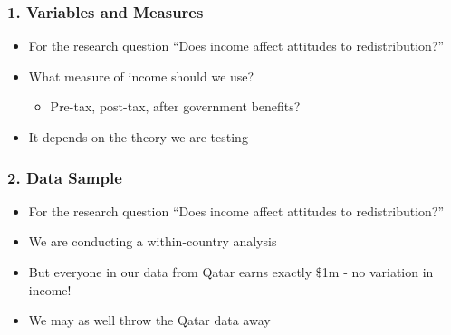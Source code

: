 \documentclass[xcolor=x11names,compress]{beamer}\usepackage[]{graphicx}\usepackage[]{color}
\renewcommand{\(}{\begin{columns}}
\renewcommand{\)}{\end{columns}}
\newcommand{\<}[1]{\begin{column}{#1}}
\renewcommand{\>}{\end{column}}
\begin{document}
\begin{frame}
\frametitle{1. Variables and Measures}
\begin{itemize}
\item For the research question ``Does income affect attitudes to redistribution?''
\pause
\item What measure of income should we use?
\pause
\begin{itemize}
\item Pre-tax, post-tax, after government benefits?
\end{itemize}
\item It depends on the theory we are testing
\end{itemize}
\end{frame}

\begin{frame}
\frametitle{2. Data Sample}
\begin{itemize}
\item For the research question ``Does income affect attitudes to redistribution?''
\pause
\item We are conducting a within-country analysis
\pause
\item But everyone in our data from Qatar earns exactly \$1m - no variation in income!
\pause
\item We may as well throw the Qatar data away
\end{itemize}
\end{frame}
\end{document}
